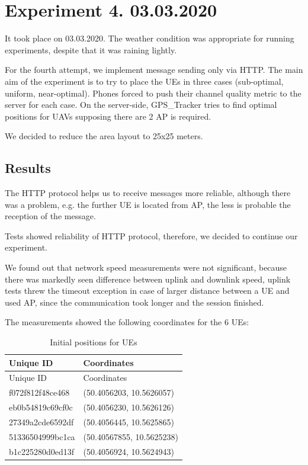 \section{Experiment 4. 03.03.2020}\label{experiment-4.-03.03.2020}

It took place on 03.03.2020. The weather condition was appropriate for running experiments, despite that it was raining lightly.

For the fourth attempt, we implement message sending only via HTTP. The main aim of the experiment is to try to place the UEs in three cases (sub-optimal, uniform, near-optimal). Phones forced to push their channel quality metric to the server for each case. On the server-side, GPS\_Tracker tries to find optimal positions for UAVs supposing there are 2 AP is required.

We decided to reduce the area layout to 25x25 meters.

\subsection{Results}\label{results}

The HTTP protocol helps us to receive messages more reliable, although there was a problem, e.g. the further UE is located from AP, the less is probable the reception of the message.

Tests showed reliability of HTTP protocol, therefore, we decided to continue our experiment.

We found out that network speed measurements were not significant, because there was markedly seen difference between uplink and downlink speed, uplink tests threw the timeout exception in case of larger distance between a UE and used AP, since the communication took longer and the session finished.

The measurements showed the following coordinates for the 6 UEs:

\begin{longtable}[]{@{}ll@{}}
\caption{Initial positions for UEs}\tabularnewline
\toprule
Unique ID & Coordinates\tabularnewline
\midrule
\endfirsthead
\toprule
Unique ID & Coordinates\tabularnewline
\midrule
\endhead
f072f812f48ce468 & (50.4056203, 10.5626057)\tabularnewline
eb0b54819c69cf0c & (50.4056230, 10.5626126)\tabularnewline
27349a2cde6592df & (50.4056445, 10.5625865)\tabularnewline
51336504999bc1ca & (50.40567855, 10.5625238)\tabularnewline
b1c225280d0ed13f & (50.4056924, 10.5624943)\tabularnewline
\bottomrule
\end{longtable}

